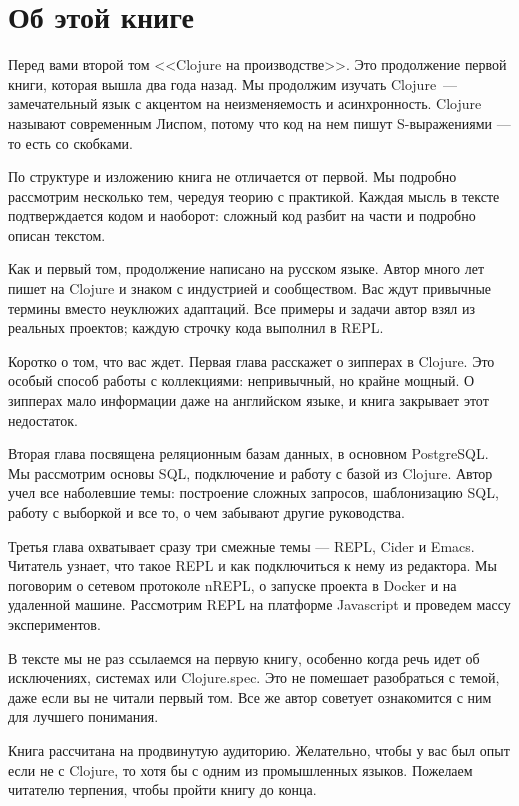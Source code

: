 
\section*{Об этой книге}

Перед вами второй том <<Clojure на производстве>>. Это продолжение первой книги,
которая вышла два года назад. Мы продолжим изучать Clojure~--- замечательный язык
с акцентом на неизменяемость и асинхронность. Clojure называют современным
Лиспом, потому что код на нем пишут S-выражениями — то есть со скобками.

По структуре и изложению книга не отличается от первой. Мы подробно рассмотрим
несколько тем, чередуя теорию с практикой. Каждая мысль в тексте подтверждается
кодом и наоборот: сложный код разбит на части и подробно описан текстом.

Как и первый том, продолжение написано на русском языке. Автор много лет пишет
на Clojure и знаком с индустрией и сообществом. Вас ждут привычные термины
вместо неуклюжих адаптаций. Все примеры и задачи автор взял из реальных
проектов; каждую строчку кода выполнил в REPL.

Коротко о том, что вас ждет. Первая глава расскажет о зипперах в Clojure. Это
особый способ работы с коллекциями: непривычный, но крайне мощный. О зипперах
мало информации даже на английском языке, и книга закрывает этот недостаток.

Вторая глава посвящена реляционным базам данных, в основном PostgreSQL. Мы
рассмотрим основы SQL, подключение и работу с базой из Clojure. Автор учел все
наболевшие темы: построение сложных запросов, шаблонизацию SQL, работу с
выборкой и все то, о чем забывают другие руководства.

Третья глава охватывает сразу три смежные темы — REPL, Cider и Emacs. Читатель
узнает, что такое REPL и как подключиться к нему из редактора. Мы поговорим о
сетевом протоколе nREPL, о запуске проекта в Docker и на удаленной
машине. Рассмотрим REPL на платформе Javascript и проведем массу экспериментов.

В тексте мы не раз ссылаемся на первую книгу, особенно когда речь идет об
исключениях, системах или Clojure.spec. Это не помешает разобраться с темой,
даже если вы не читали первый том. Все же автор советует ознакомится с ним для
лучшего понимания.

Книга рассчитана на продвинутую аудиторию. Желательно, чтобы у вас был опыт если
не с Clojure, то хотя бы с одним из промышленных языков. Пожелаем читателю
терпения, чтобы пройти книгу до конца.

